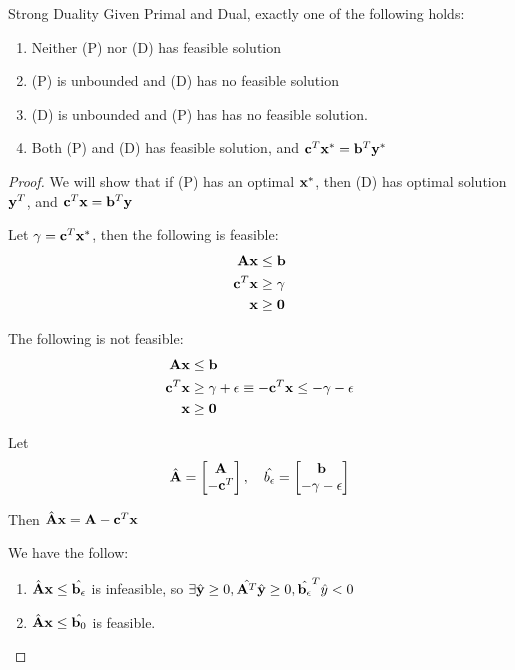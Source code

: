 \begin{thm}{Strong Duality}
    Given Primal and Dual, exactly one of the following holds:
    \begin{enumerate}
        \item Neither (P) nor (D) has feasible solution
        \item (P) is unbounded and (D) has no feasible solution
        \item (D) is unbounded and (P) has has no feasible solution.
        \item Both (P) and (D) has feasible solution, and $\mathbf{c}^T\mathbf{x}^* =
            \mathbf{b}^T\mathbf{y}^*$ 
    \end{enumerate}
\end{thm}
\begin{proof}
    We will show that if (P) has an optimal $\mathbf{x}^*$, then (D) has optimal
    solution $\mathbf{y}^T$, and $\mathbf{c}^T \mathbf{x} = \mathbf{b}^T\mathbf{y}$

    Let $\gamma = \mathbf{c}^T\mathbf{x}^*$, then the following is feasible:
    \begin{align*}
        \mathbf{A}\mathbf{x} &\leq \mathbf{b} \\
        \mathbf{c}^T \mathbf{x} &\geq \gamma \\
        \mathbf{x} &\geq \mathbf{0}
    \end{align*}

    The following is not feasible:
    \begin{align*}
        \mathbf{A}\mathbf{x} &\leq \mathbf{b} \\
        \mathbf{c}^T \mathbf{x} &\geq \gamma + \epsilon \equiv -\mathbf{c}^T \mathbf{x} \leq -\gamma -
        \epsilon\\
        \mathbf{x} &\geq \mathbf{0}
    \end{align*}

    Let \[\hat{\mathbf{A}} = \begin{bmatrix} \mathbf{A} \\ -\mathbf{c}^T\end{bmatrix}, \quad
    \hat{b_\epsilon} = \begin{bmatrix} \mathbf{b}\\ -\gamma -\epsilon \end{bmatrix}  \]

    Then $\hat{\mathbf{A}} \mathbf{x} = \mathbf{A} - \mathbf{c}^T \mathbf{x}$

    We have the follow:
    \begin{enumerate}
        \item $\hat{\mathbf{A}} \mathbf{x}  \leq \hat{\mathbf{b}_\epsilon}$ is infeasible, so
            $\exists \hat{\mathbf{y}} \geq 0, \hat{\mathbf{A}^T} \hat{\mathbf{y}} \geq 0,
            \hat{\mathbf{b}_\epsilon}^T \hat{y} < 0$
        \item $\hat{\mathbf{A}} \mathbf{x}  \leq \hat{\mathbf{b}_0}$ is feasible.
    \end{enumerate}
    
\end{proof}

